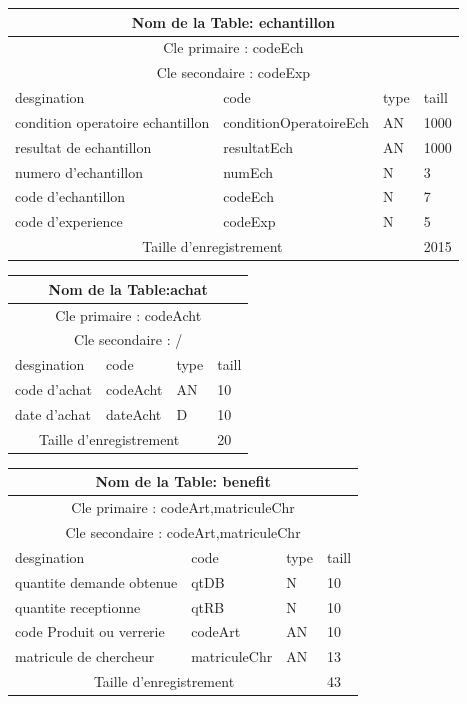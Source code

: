 \begin{tabular}{ |p{5cm}||p{4cm}|p{3cm}|p{3cm}|  }
    \hline
    \multicolumn{4}{|c|}{Nom de la Table: echantillon } \\
    \hline
    \multicolumn{4}{|c|}{Cle primaire : codeEch } \\
    \hline
    \multicolumn{4}{|c|}{Cle secondaire : codeExp } \\
    \hline
    \hline
    desgination&code&type&taill \\
    \hline
    condition operatoire echantillon&conditionOperatoireEch&AN&1000 \\
    resultat de echantillon&resultatEch&AN&1000 \\
    numero d'echantillon&numEch&N&3 \\
    code d'echantillon&codeEch&N&7 \\
    code d'experience&codeExp&N&5 \\
    \hline
    \hline
    \multicolumn{3}{|c|}{Taille d’enregistrement} & 2015\\
    \hline
\end{tabular}

\vspace{2cm}

\begin{tabular}{ |p{5cm}||p{4cm}|p{3cm}|p{3cm}|  }
    \hline
    \multicolumn{4}{|c|}{Nom de la Table:achat } \\
    \hline
    \multicolumn{4}{|c|}{Cle primaire : codeAcht} \\
    \hline
    \multicolumn{4}{|c|}{Cle secondaire : / } \\
    \hline
    \hline
    desgination&code&type&taill \\
    \hline
    code d'achat&codeAcht&AN&10 \\
    date d'achat&dateAcht&D&10 \\
    \hline
    \hline
    \multicolumn{3}{|c|}{Taille d’enregistrement} & 20\\
    \hline
\end{tabular}

\vspace{2cm}

\begin{tabular}{ |p{5cm}||p{4cm}|p{3cm}|p{3cm}|  }
    \hline
    \multicolumn{4}{|c|}{Nom de la Table: benefit } \\
    \hline
    \multicolumn{4}{|c|}{Cle primaire : codeArt,matriculeChr } \\
    \hline
    \multicolumn{4}{|c|}{Cle secondaire : codeArt,matriculeChr } \\
    \hline
    \hline
    desgination&code&type&taill \\
    \hline
    
    quantite demande obtenue&qtDB&N&10 \\
    quantite receptionne&qtRB&N&10 \\
    code Produit ou verrerie&codeArt&AN&10 \\
    matricule de chercheur&matriculeChr&AN&13 \\
    \hline
    \hline
    \multicolumn{3}{|c|}{Taille d’enregistrement} & 43\\
    \hline
\end{tabular}

